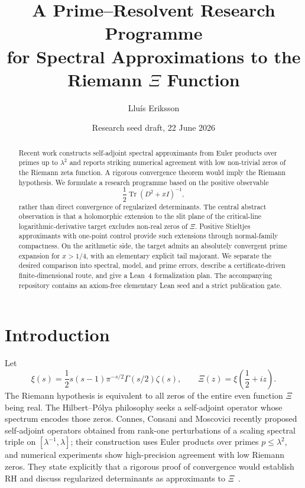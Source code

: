 \documentclass[11pt]{article}
\title{A Prime--Resolvent Research Programme\\
for Spectral Approximations to the Riemann $\Xi$ Function}
\author{Lluís Eriksson}
\date{Research seed draft, 22 June 2026}
\theoremstyle{definition}
\newcommand{\Tr}{\operatorname{Tr}}
\begin{document}
\maketitle

\begin{center}
\end{center}

\begin{abstract}
Recent work constructs self-adjoint spectral approximants from Euler products
over primes up to $\lambda^2$ and reports striking numerical agreement with low
non-trivial zeros of the Riemann zeta function.  A rigorous convergence theorem
would imply the Riemann hypothesis.  We formulate a research programme based on
the positive observable
\[
\frac12\Tr(D^2+xI)^{-1},
\]
rather than direct convergence of regularized determinants.  The central
abstract observation is that a holomorphic extension to the slit plane of the
critical-line logarithmic-derivative target excludes non-real zeros of $\Xi$.
Positive Stieltjes approximants with one-point control provide such extensions
through normal-family compactness.  On the arithmetic side, the target admits
an absolutely convergent prime expansion for $x>1/4$, with an elementary
explicit tail majorant.  We separate the desired comparison into spectral,
model, and prime errors, describe a certificate-driven finite-dimensional
route, and give a Lean~4 formalization plan.  The accompanying repository
contains an axiom-free elementary Lean seed and a strict publication gate.
\end{abstract}

\section{Introduction}

Let
\[
\xi(s)=\frac12s(s-1)\pi^{-s/2}\Gamma(s/2)\zeta(s),
\qquad
\Xi(z)=\xi\!\left(\frac12+iz\right).
\]
The Riemann hypothesis is equivalent to all zeros of the entire even function
$\Xi$ being real.  The Hilbert--Pólya philosophy seeks a self-adjoint operator
whose spectrum encodes those zeros.  Connes, Consani and Moscovici recently
proposed self-adjoint operators obtained from rank-one perturbations of a
scaling spectral triple on $[\lambda^{-1},\lambda]$; their construction uses
Euler products over primes $p\leq \lambda^2$, and numerical experiments show
high-precision agreement with low Riemann zeros.  They state explicitly that a
rigorous proof of convergence would establish RH and discuss regularized
determinants as approximants to $\Xi$~\cite{CCM2025}.
\end{document}
